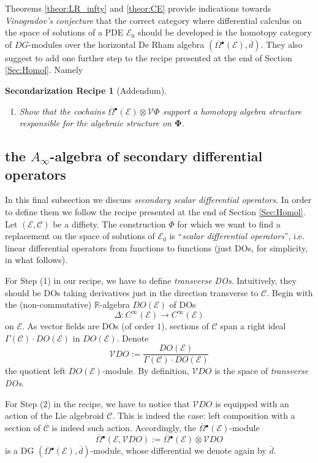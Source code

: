 \documentclass{conm-p-l}
\newtheorem*{recipe}{Secondarization Recipe}
\theoremstyle{definition}
\theoremstyle{remark}
\numberwithin{equation}{section}
\begin{document}
Theorems \ref{theor:LR_infty} and \ref{theor:CE} provide indications towards \emph{Vinogradov's conjecture} that the correct category where differential calculus on the space of solutions of a PDE $\mathscr E_0$ should be developed is the homotopy category of $DG$-modules over the horizontal De Rham algebra $(\overline \Omega{}^\bullet (\mathscr E), \overline d)$. They also suggest to add one further step to the recipe presented at the end of Section \ref{Sec:Homol}. Namely

\begin{recipe}[Addendum]\label{addendum}\quad
\begin{enumerate}
\item[(5)] Show that the cochains $\overline \Omega{}^\bullet (\mathscr E) \otimes \mathscr V \Phi$ support a homotopy algebra structure responsible for the algebraic structure on $\boldsymbol{\Phi}$.
\end{enumerate}
\end{recipe}

\subsection{the $A_\infty$-algebra of secondary differential operators}

In this final subsection we discuss \emph{secondary scalar differential operators}. In order to define them we follow the recipe presented at the end of Section \ref{Sec:Homol}. Let $(\mathscr E, \mathscr C)$ be a diffiety. The construction $\Phi$ for which we want to find a replacement on the space of solutions of $\mathscr E_0$ is ``\emph{scalar differential operators}'', i.e.{} linear differential operators from functions to functions (just DOs, for simplicity, in what follows).

For Step (1) in our recipe, we have to define \emph{transverse DOs}. Intuitively, they should be DOs taking derivatives just in the direction transverse to $\mathscr C$. Begin with the (non-commutative) $\mathbb R$-algebra $DO (\mathscr E)$ of DOs
\[
\Delta : C^\infty (\mathscr E) \to C^\infty (\mathscr E)
\]
on $\mathscr E$. As vector fields are DOs (of order $1$), sections of $\mathscr C$ span a right ideal $\Gamma (\mathscr C) \cdot DO(\mathscr E)$ in $DO (\mathscr E)$. Denote
\[
\mathscr VDO := \frac{DO(\mathscr E)}{\Gamma (\mathscr C) \cdot DO(\mathscr E)}
\] 
the quotient left $DO(\mathscr E)$-module. By definition, $\mathscr V DO$ is the space of \emph{transverse DOs}.

For Step (2) in the recipe, we have to notice that $\mathscr V DO$ is equipped with an action of the Lie algebroid $\mathscr C$. This is indeed the case: left composition with a section of $\mathscr C$ is indeed such action. Accordingly, the $\overline \Omega{}^\bullet (\mathscr E)$-module
\[
\overline \Omega{}^\bullet (\mathscr E, \mathscr V DO) := \overline \Omega{}^\bullet (\mathscr E) \otimes \mathscr V DO
\]
is a DG $(\overline \Omega{}^\bullet (\mathscr E), \overline d)$-module, whose differential we denote again by $\overline d$.
\end{document}
